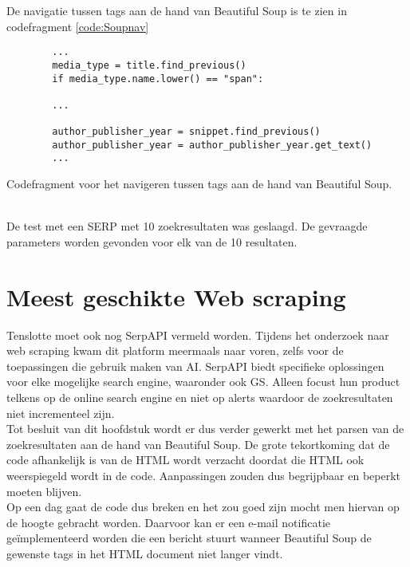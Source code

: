 De navigatie tussen tags aan de hand van Beautiful Soup is te zien in codefragment \ref{code:Soupnav}
\begin{listing}
    \begin{verbatim}
        ...
        media_type = title.find_previous()
        if media_type.name.lower() == "span":
        
        ...
        
        author_publisher_year = snippet.find_previous()
        author_publisher_year = author_publisher_year.get_text()
        ...
    \end{verbatim}
    \caption[Beautiful Soup navigatie codefragment]{Codefragment voor het navigeren tussen tags aan de hand van Beautiful Soup.}
    \label{code:Soupnav}
\end{listing}
\\
De test met een SERP met 10 zoekresultaten was geslaagd. De gevraagde parameters worden gevonden voor elk van de 10 resultaten.
\section{Meest geschikte Web scraping}
Tenslotte moet ook nog SerpAPI \autocite{Serpapi2025} vermeld worden. Tijdens het onderzoek naar web scraping kwam dit platform meermaals naar voren, zelfs voor de toepassingen die gebruik maken van AI. SerpAPI biedt specifieke oplossingen voor elke mogelijke search engine, waaronder ook GS. Alleen focust hun product telkens op de online search engine en niet op alerts waardoor de zoekresultaten niet incrementeel zijn.\\
Tot besluit van dit hoofdstuk wordt er dus verder gewerkt met het parsen van de zoekresultaten aan de hand van Beautiful Soup. De grote tekortkoming dat de code afhankelijk is van de HTML wordt verzacht doordat die HTML ook weerspiegeld wordt in de code. Aanpassingen zouden dus begrijpbaar en beperkt moeten blijven.\\
Op een dag gaat de code dus breken en het zou goed zijn mocht men hiervan op de hoogte gebracht worden. Daarvoor kan er een e-mail notificatie geïmplementeerd worden die een bericht stuurt wanneer Beautiful Soup de gewenste tags in het HTML document niet langer vindt.
